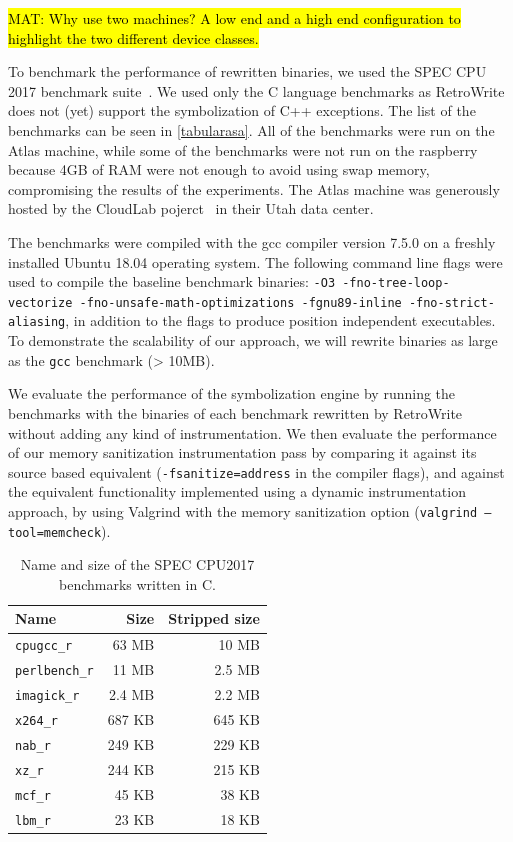 \documentclass[a4paper,11pt,oneside]{report}
\newcommand{\sysname}{RetroWrite\xspace}
\DeclareRobustCommand{\mat}[1]{{\sethlcolor{red}\hl{MAT: #1}}}
\begin{document}
\mat{Why use two machines? A low end and a high end configuration to highlight the two different
device classes.}

To benchmark the performance of rewritten binaries, we used the SPEC CPU 2017
benchmark suite~\cite{speccpu2017}.  We used only the C language benchmarks as
\sysname does not (yet) support the symbolization of C++ exceptions. The list of the
benchmarks can be seen in \autoref{tabularasa}.  All of the benchmarks were run on
the Atlas machine, while some of the benchmarks were not run on the raspberry because
4GB of RAM were not enough to avoid using swap memory, compromising the results
of the experiments. The Atlas machine was generously hosted by the CloudLab
pojerct~\cite{cloudlab} in their Utah data center. 

The benchmarks were compiled with the gcc compiler version 7.5.0 on a freshly
installed Ubuntu 18.04 operating system. The following command line flags were
used to compile the baseline benchmark binaries: \texttt{-O3
-fno-tree-loop-vectorize -fno-unsafe-math-optimizations -fgnu89-inline
-fno-strict-aliasing}, in addition to the flags to produce position independent
executables. To demonstrate the scalability of our approach, we will rewrite
binaries as large as the \texttt{gcc} benchmark (> 10MB).



We evaluate the performance of the symbolization engine by running the
benchmarks with the binaries of each benchmark rewritten by \sysname without
adding any kind of instrumentation. We then evaluate the performance of our
memory sanitization instrumentation pass by comparing it against its source
based equivalent (\texttt{-fsanitize=address} in the compiler flags), and
against the equivalent functionality implemented using a dynamic
instrumentation approach, by using Valgrind with the memory sanitization option
(\texttt{valgrind --tool=memcheck}).




\begin{table}
\centering
\begin{tabular}{lrr}
\toprule
	\textbf{Name} & \textbf{Size} & \textbf{Stripped size} \\
\toprule
	\texttt{cpugcc\_r   }              & 63 MB  & 10 MB  \\
	\texttt{perlbench\_r} \hspace{2em} & 11 MB  & 2.5 MB \\
	\texttt{imagick\_r  }              & 2.4 MB & 2.2 MB \\
	\texttt{x264\_r }                  & 687 KB & 645 KB \\
	\texttt{nab\_r      }              & 249 KB & 229 KB \\
	\texttt{xz\_r   }                  & 244 KB & 215 KB \\
	\texttt{mcf\_r      }              & 45 KB  & 38 KB  \\
	\texttt{lbm\_r      }              & 23 KB  & 18 KB  \\
\bottomrule
\end{tabular}
\caption{Name and size of the SPEC CPU2017 benchmarks written in C.}
\label{tabularasa}
\end{table}
\end{document}
